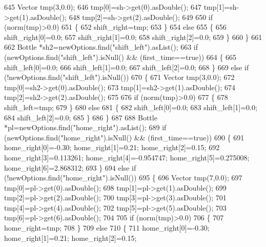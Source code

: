\begin{DoxyCode}
645         Vector tmp(3,0.0);
646         tmp[0]=sh->get(0).asDouble();
647         tmp[1]=sh->get(1).asDouble();
648         tmp[2]=sh->get(2).asDouble();
649 
650         \textcolor{keywordflow}{if} (norm(tmp)>0.0)
651         \{
652             shift\_right=tmp;
653         \}
654         \textcolor{keywordflow}{else}
655         \{
656             shift\_right[0]=0.0;
657             shift\_right[1]=0.0;
658             shift\_right[2]=0.0;
659         \}
660     \}
661 
662     Bottle *sh2=newOptions.find(\textcolor{stringliteral}{"shift\_left"}).asList();
663     \textcolor{keywordflow}{if} (newOptions.find(\textcolor{stringliteral}{"shift\_left"}).isNull() && (first\_time==\textcolor{keyword}{true}))
664     \{
665         shift\_left[0]=0.0;
666         shift\_left[1]=0.0;
667         shift\_left[2]=0.0;
668     \}
669     \textcolor{keywordflow}{else} \textcolor{keywordflow}{if} (!newOptions.find(\textcolor{stringliteral}{"shift\_left"}).isNull())
670     \{
671         Vector tmp(3,0.0);
672         tmp[0]=sh2->get(0).asDouble();
673         tmp[1]=sh2->get(1).asDouble();
674         tmp[2]=sh2->get(2).asDouble();
675 
676         \textcolor{keywordflow}{if} (norm(tmp)>0.0)
677         \{
678             shift\_left=tmp;
679         \}
680         \textcolor{keywordflow}{else}
681         \{
682             shift\_left[0]=0.0;
683             shift\_left[1]=0.0;
684             shift\_left[2]=0.0;
685         \}
686 \}
687 
688     Bottle *pl=newOptions.find(\textcolor{stringliteral}{"home\_right"}).asList();
689     \textcolor{keywordflow}{if} (newOptions.find(\textcolor{stringliteral}{"home\_right"}).isNull() && (first\_time==\textcolor{keyword}{true}))
690     \{
691         home\_right[0]=-0.30; home\_right[1]=0.21; home\_right[2]=0.15;
692         home\_right[3]=0.113261; home\_right[4]=-0.954747; home\_right[5]=0.275008; home\_right[6]=2.868312;
693     \}
694     \textcolor{keywordflow}{else} \textcolor{keywordflow}{if} (!newOptions.find(\textcolor{stringliteral}{"home\_right"}).isNull())
695     \{
696         Vector tmp(7,0.0);
697         tmp[0]=pl->get(0).asDouble();
698         tmp[1]=pl->get(1).asDouble();
699         tmp[2]=pl->get(2).asDouble();
700         tmp[3]=pl->get(3).asDouble();
701         tmp[4]=pl->get(4).asDouble();
702         tmp[5]=pl->get(5).asDouble();
703         tmp[6]=pl->get(6).asDouble();
704 
705         \textcolor{keywordflow}{if} (norm(tmp)>0.0)
706         \{
707             home\_right=tmp;
708         \}
709         \textcolor{keywordflow}{else}
710         \{
711             home\_right[0]=-0.30; home\_right[1]=0.21; home\_right[2]=0.15;

\end{DoxyCode}
